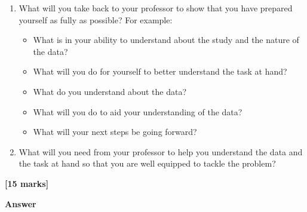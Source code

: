 \documentclass[
  10t,
]{article}
\providecommand{\tightlist}{%
  \setlength{\itemsep}{0pt}\setlength{\parskip}{0pt}}
\begin{document}
\begin{enumerate}
\def\labelenumi{\alph{enumi}.}
\tightlist
\item
  What will you take back to your professor to show that you have
  prepared yourself as fully as possible? For example:

  \begin{itemize}
  \tightlist
  \item
    What is in your ability to understand about the study and the nature
    of the data?
  \item
    What will you do for yourself to better understand the task at hand?
  \item
    What do you understand about the data?
  \item
    What will you do to aid your understanding of the data?
  \item
    What will your next steps be going forward?
  \end{itemize}
\item
  What will you need from your professor to help you understand the data
  and the task at hand so that you are well equipped to tackle the
  problem?
\end{enumerate}

\textbf{{[}15 marks{]}}

\textbf{Answer}
\end{document}
